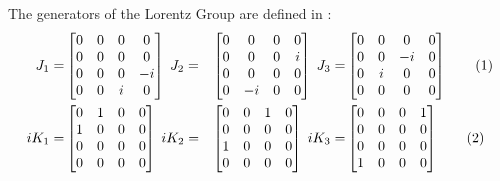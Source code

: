 \documentclass[]{article}
\newcommand\numberthis{\addtocounter{equation}{1}\tag{\theequation}}
\begin{document}
The generators of the Lorentz Group are defined in \cite[II.3,(2,5,6)]{zee2010quantum}:
\begin{align*}
	J_1 =& \begin{bmatrix}
		0&0&0&0\\
		0&0&0&0\\
		0&0&0&-i\\
		0&0&i&0\\
	\end{bmatrix}\;
	J_2 =& \begin{bmatrix}
		0&0&0&0\\
		0&0&0&i\\
		0&0&0&0\\
		0&-i&0&0\\
	\end{bmatrix}\;
	J_3 =& \begin{bmatrix}
		0&0&0&0\\
		0&0&-i&0\\
		0&i&0&0\\
		0&0&0&0\\
	\end{bmatrix} \numberthis \label{eq:Js}\\
	i K_1 =& \begin{bmatrix}
		0&1&0&0\\
		1&0&0&0\\
		0&0&0&0\\
		0&0&0&0\\
	\end{bmatrix}\;
	i K_2 =& \begin{bmatrix}
		0&0&1&0\\
		0&0&0&0\\
		1&0&0&0\\
		0&0&0&0\\
	\end{bmatrix}\;
	i K_3 =& \begin{bmatrix}
		0&0&0&1\\
		0&0&0&0\\
		0&0&0&0\\
		1&0&0&0\\
	\end{bmatrix} \numberthis \label{eq:Ks}
\end{align*}
\end{document}
